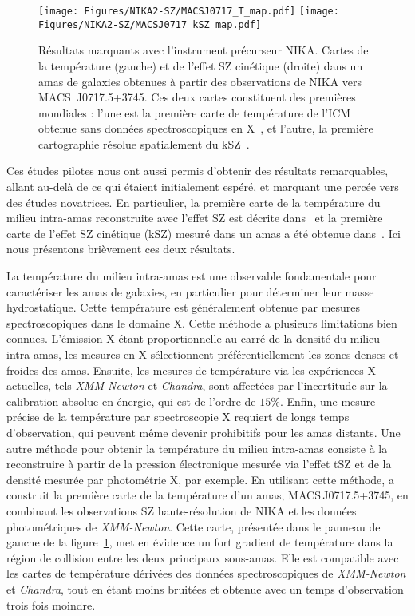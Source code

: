 %
\begin{figure}
  \centering
  \texttt{[image: Figures/NIKA2-SZ/MACSJ0717\_T\_map.pdf]}
  \texttt{[image: Figures/NIKA2-SZ/MACSJ0717\_kSZ\_map.pdf]}
  \caption{Résultats marquants avec l'instrument précurseur NIKA. Cartes de la température (gauche) et  de l'effet SZ cinétique (droite) dans un amas de galaxies obtenues à partir des observations de NIKA vers \mbox{MACS~J0717.5+3745}. Ces deux cartes constituent des premières mondiales : l'une est la première carte de température de l'ICM obtenue sans données spectroscopiques en X~\citep{Adam2017}, et l'autre, la première cartographie résolue spatialement du kSZ~\citep{Adam2017kSZ}.}
  \label{fig:nikanika2}
\end{figure}
%
Ces études pilotes nous ont aussi permis d'obtenir des résultats
remarquables, allant au-delà de ce qui étaient initialement espéré, et
marquant une percée vers des études novatrices. En particulier,
la première carte de la température du milieu intra-amas reconstruite
avec l'effet SZ est décrite dans~\citet{Adam2017} et la première carte
de l'effet SZ cinétique (kSZ) mesuré dans un amas a été obtenue 
dans~\citet{Adam2017kSZ}. Ici nous présentons brièvement ces deux
résultats.

La température du milieu intra-amas est une observable fondamentale pour
caractériser les amas de galaxies, en particulier pour déterminer leur
masse hydrostatique. Cette température est généralement obtenue par
mesures spectroscopiques dans le domaine X. Cette méthode a plusieurs
limitations bien connues. L'émission X étant proportionnelle au carré
de la densité du milieu intra-amas, les mesures en X sélectionnent
préférentiellement les zones denses et froides des amas. Ensuite, les
mesures de température via les expériences X actuelles, tels
\emph{XMM-Newton} et \emph{Chandra}, sont affectées par l'incertitude
sur la calibration absolue en énergie, qui est de l'ordre de
$15\%$. Enfin, une mesure précise de la température par spectroscopie
X requiert de longs temps d'observation, qui peuvent même devenir
prohibitifs pour les amas distants. Une autre méthode pour obtenir la
température du milieu intra-amas consiste à la reconstruire à partir
de la pression électronique mesurée via l'effet tSZ et de la densité
mesurée par photométrie X, par exemple. En utilisant cette méthode,
\citet{Adam2017} a construit la première carte de la température d'un
amas, MACS\,J0717.5+3745, en combinant les observations SZ
haute-résolution de NIKA et les données photométriques de
\emph{XMM-Newton}. Cette carte, présentée dans le panneau de gauche de
la figure~\ref{fig:nikanika2}, met en évidence un fort gradient de
température dans la région de collision entre les deux principaux
sous-amas. Elle est compatible avec les cartes de température dérivées
des données spectroscopiques de \emph{XMM-Newton} et \emph{Chandra},
tout en étant moins bruitées et obtenue avec un temps d'observation
trois fois moindre.


